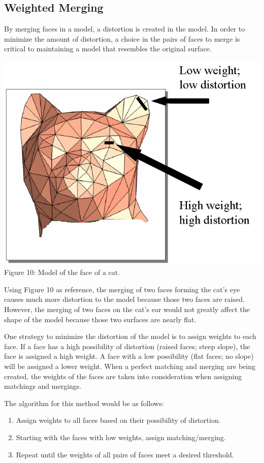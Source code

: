 \documentclass[12pt]{article}
\begin{document}
\begin{flushleft}
\newpage
\subsection*{Weighted Merging}
By merging faces in a model, a distortion is created in the model. In order to minimize the amount of distortion, a choice in the pairs of faces to merge is critical to maintaining a model that resembles the original surface.

\begin{center}
\includegraphics[scale=0.5]{images/distortion.png}\\
Figure 10: Model of the face of a cat.
\end{center}

\medskip
Using Figure 10 as reference, the merging of two faces forming the cat's eye causes much more distortion to the model because those two faces are raised. However, the merging of two faces on the cat's ear would not greatly affect the shape of the model because those two surfaces are nearly flat.

\medskip
One strategy to minimize the distortion of the model is to assign weights to each face. If a face has a high possibility of distortion (raised faces; steep slope), the face is assigned a high weight. A face with a low possibility (flat faces; no slope) will be assigned a lower weight. When a perfect matching and merging are being created, the weights of the faces are taken into consideration when assigning matchings and mergings.

\medskip
The algorithm for this method would be as follows:
\begin{enumerate}
\item Assign weights to all faces based on their possibility of distortion.
\item Starting with the faces with low weights, assign matching/merging.
\item Repeat until the weights of all pairs of faces meet a desired threshold.
\end{enumerate}


\end{flushleft}
\end{document}
